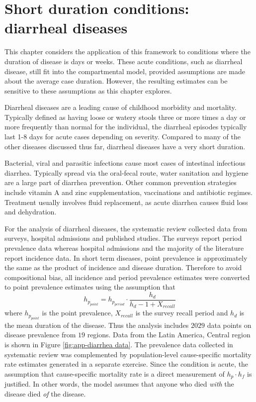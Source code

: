 \chapter{Short duration conditions: diarrheal diseases}
\label{applications-short_dur}

This chapter considers the application of this framework to
conditions where the duration of disease is days or weeks. These acute
conditions, such as diarrheal disease, still fit into the
compartmental model, provided assumptions are made about the average
case duration.  However, the resulting estimates can be sensitive to these
assumptions as this chapter explores.

Diarrheal diseases are a leading cause of childhood morbidity and
mortality.  Typically defined as having loose or watery stools three
or more times a day or more frequently than normal for the individual,
the diarrheal episodes typically last 1-8 days for acute cases
depending on severity. \cite{unicef_diarrhoea_2009,
  carlos_etiology_1990, lamberti_systematic_2012} Compared to many of
the other diseases discussed thus far, diarrheal diseases have a very
short duration.

Bacterial, viral and parasitic infections cause most cases of
intestinal infectious diarrhea.  Typically spread via the oral-fecal
route, water sanitation and hygiene are a large part of diarrhea
prevention.  Other common prevention strategies include vitamin A and zinc supplementation, vaccinations and antibiotic regimes.  Treatment
usually involves fluid replacement, as acute
diarrhea causes fluid loss and dehydration. \cite{wardlaw_diarrhoea:_2010,
  carlos_etiology_1990, lamberti_systematic_2012}

For the analysis of diarrheal diseases, the systematic review collected data
from surveys, hospital admissions and published studies.  The
surveys report period prevalence data whereas hospital admissions and
the majority of the literature report incidence data.  In short term
diseases, point prevalence is approximately the same as the product of
incidence and disease duration.  Therefore to avoid compositional
bias, all incidence and period prevalence estimates were converted to
point prevalence estimates using the assumption that
    \begin{equation}
    	h_{p_{point}}=h_{p_{period}} \cdot
        \frac{h_{d}}{h_{d}-1+X_{recall}}
    \end{equation}
where $h_{p_{point}}$ is the point prevalence, $X_{recall}$ is the
survey recall period and $h_{d}$ is the mean duration of the disease.
Thus the analysis includes $2029$ data points on disease prevalence
from $19$ regions.  Data from the Latin America, Central region is shown
in Figure \ref{fig:app-diarrhea data}.  The prevalence data collected
in systematic review was complemented by population-level
cause-specific mortality rate estimates generated in a separate
exercise.  Since the condition is acute, the assumption that
cause-specific mortality rate is a direct measurement of $h_{p}\cdot
h_f$ is justified.  In other words, the model assumes that anyone who
died \emph{with} the disease died \emph{of} the disease.

